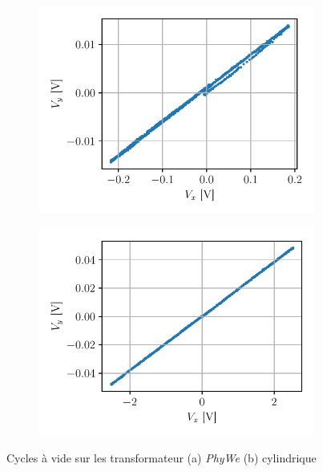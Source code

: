 \begin{figure}[h]
    \centering
    \begin{subfigure}{0.5\linewidth}
        \centering
        \includegraphics[width=\linewidth]{figures/G1-phywe-vide.pdf}
        \caption{}
        \label{fig:phywe_vide}
    \end{subfigure}%
    \begin{subfigure}{0.5\linewidth}
        \centering
        \includegraphics[width=\linewidth]{figures/G1-cylindre-vide.pdf}
        \caption{}
        \label{fig:cylindre_vide}
    \end{subfigure}
    \caption{Cycles à vide sur les transformateur (a) \textit{PhyWe} (b) cylindrique}
\end{figure}

